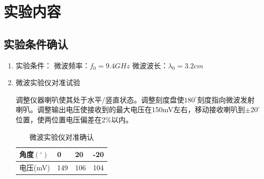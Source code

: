 \documentclass[11pt]{article}
\begin{document}
\begin{enumerate}[itemjoin=\\]
\end{enumerate}

\section{实验内容}

\subsection{实验条件确认}
\begin{enumerate}
    
    
    \item 实验条件：\hspace{2em} 微波频率：$f_0=9.4GHz$ \hspace{2em} 微波波长：$\lambda_0=3.2cm$
    \item 微波实验仪对准试验
    \par \hspace*{2em}调整仪器喇叭使其处于水平/竖直状态。调整刻度盘使$180^\circ$刻度指向微波发射喇叭。调整输出电压使接收到的最大电压在150mV左右，移动接收喇叭到$\pm 20^\circ$位置，使两位置电压偏差在2\%以内。
    \begin{table}[H]
        \centering
        \caption{微波实验仪对准确认}
        \begin{tabularx}{0.5\textwidth}{|X|X|X|X|}\hline
            角度$(^\circ)$  &  0  &  20  &  -20  \\\hline
            电压(mV)  &  149  &  106  &  104  \\\hline
            
        \end{tabularx}
        
    \end{table}
    
\end{enumerate}
\end{document}
